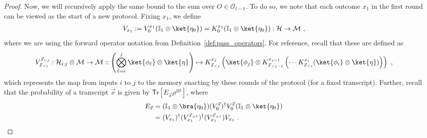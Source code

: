 \documentclass[11pt]{article}
\newcommand{\id}{\ensuremath{\mathbb{I}}}
\newcommand{\Tr}{\mathsf{Tr}}
\newcommand{\Oc}{\mathcal{O}}
\newcommand{\Hc}{\mathcal{H}}
\newcommand{\Mc}{\mathcal{M}}
\begin{document}
\begin{proof}
    Now, we will recursively apply the same bound to the sum over $O \in \Oc_{t-1}$. To do so, we note that each outcome $x_1$ in the first round can be viewed as the start of a new protocol. Fixing $x_1$, we define
    \begin{align}
        V_{x_1} := V_0^{x_1} (\id_1 \otimes \ket{\eta_0}) = K_{0}^{x_1}(\id_1 \otimes \ket{\eta_0}): \Hc \rightarrow \Mc \ ,
    \end{align}
    where we are using the forward operator notation from Definition~\ref{def:pass_operators}. For reference, recall that these are defined as
    \begin{align}
        V_{\vec{x}_{<i}}^{\vec{x}_{i:j}}: \Hc_{i:j}\otimes \Mc\rightarrow \Mc :: \left( \bigotimes_{\ell=i}^j \ket{\phi_\ell}\otimes \ket{\eta} \right) \mapsto K_{\vec{x}_{<j}}^{x_j} \left( \ket{\phi_j}\otimes K_{\vec{x}_{< j-1}}^{x_{j-1}}\left( \cdots K_{\vec{x}_{< i}}^{x_i}(\ket{\phi_i}\otimes \ket{\eta}) \right) \right) \ ,
    \end{align}
    which represents the map from inputs $i$ to $j$ to the memory enacting by these rounds of the protocol (for a fixed transcript). Further, recall that the probability of a transcript $\vec{x}$ is given by $\Tr[E_{\vec{x}} \rho^{\otimes t}]$, where
    \begin{align}
        E_{\vec{x}} & = (\id_1 \otimes \bra{\eta_0})(V_0^{\vec{x}})^\dagger V_0^{\vec{x}}(\id_1\otimes \ket{\eta_0}) \\
        & = (V_{x_1})^\dagger (V_{x_1}^{\vec{x}_{>1}})^\dagger (V_{x_1}^{\vec{x}_{>1}}) V_{x_1}\ .
    \end{align}
    

\end{proof}
\end{document}
